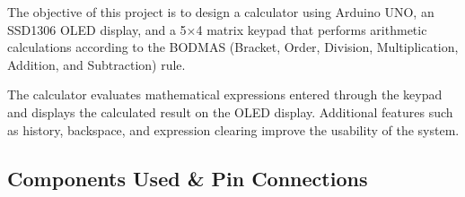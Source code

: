 The objective of this project is to design a calculator using Arduino UNO, an SSD1306 OLED display, and a 5×4 matrix keypad that performs arithmetic calculations according to the BODMAS (Bracket, Order, Division, Multiplication, Addition, and Subtraction) rule.

The calculator evaluates mathematical expressions entered through the keypad and displays the calculated result on the OLED display. Additional features such as history, backspace, and expression clearing improve the usability of the system.


\subsection{Components Used \& Pin Connections}

